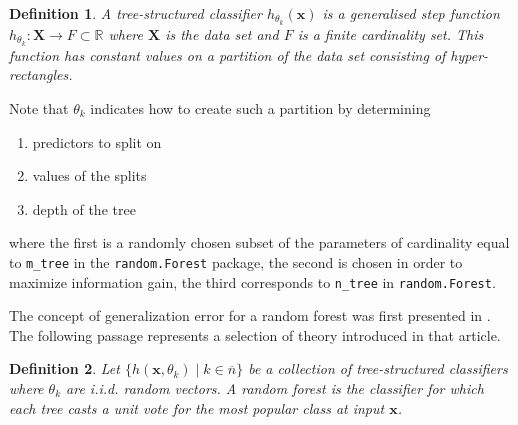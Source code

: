 \documentclass[a4paper,12pt]{article}
\newtheorem{definition}{Definition}[section]
\begin{document}
\begin{definition}
A tree-structured classifier $h_{\theta_{k} }(\textbf{x})$ is a
generalised step function $h_{\theta_{k} }: \textbf{X} \rightarrow F
\subset \mathbb{R}$ where $\textbf{X}$ is the data set and $F$ is a finite
cardinality set. This function has constant values on a partition of the
data set consisting of hyper-rectangles.
\end{definition}
Note that $\theta_{k}$ indicates how to create such a partition by
determining
\begin{enumerate}
\item predictors to split on
\item values of the splits
\item depth of the tree
\end{enumerate}
where the first is a randomly chosen subset of the parameters of
cardinality equal to \texttt{m\_tree} in the \texttt{random.Forest}
package, the second is chosen in order to maximize information gain, the
third corresponds to \texttt{n\_tree} in \texttt{random.Forest}.

The concept of generalization error for a random forest was first
presented in \cite{breiman2001random}. The following passage represents a
selection of  theory introduced in that article.

\begin{definition}
Let $\{h( \textbf{x},  \theta_{k} ) \mid k \in  \overline{n} \}$ be a
collection of tree-structured classifiers where $\theta_{k}$ are i.i.d.
random vectors. A random forest is the classifier for which each tree
casts a unit vote for the most popular class at input $\textbf{x}$.
\end{definition}
\end{document}
